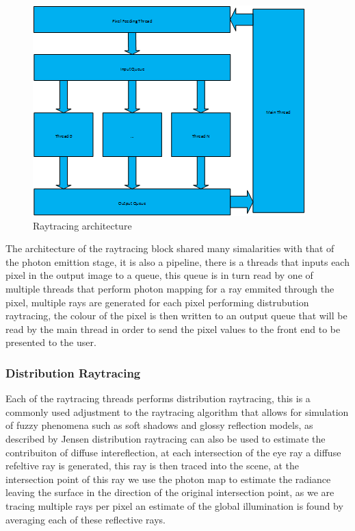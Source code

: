 \begin{figure}
\centering
\includegraphics{./images/pixel_threading.png}
\caption{Raytracing architecture}
\label{fig:pixel_generation}
\end{figure}

The architecture of the raytracing block shared many simalarities with that of the photon emittion stage,
it is also a pipeline, there is a threads that inputs each pixel in the output image to a queue, this queue
is in turn read by one of multiple threads that perform photon mapping for a ray emmited through the pixel,
multiple rays are generated for each pixel performing distrubution raytracing, the colour of the pixel is
then written to an output queue that will be read by the main thread in order to send the pixel values to
the front end to be presented to the user.

\subsubsection{Distribution Raytracing}
Each of the raytracing threads performs distribution raytracing, this is a commonly used adjustment to the 
raytracing algorithm that allows for simulation of fuzzy phenomena such as soft shadows and glossy reflection
models, as described by Jensen \cite{JensenBook} distribution raytracing can also be used to estimate the contribuiton
of diffuse intereflection, at each intersection of the eye ray a diffuse refeltive 
 ray is generated, this ray is then traced into the scene, at the intersection point of this ray
we use the photon map to estimate the radiance leaving the surface in the direction of the original intersection
point, as we are tracing multiple rays per pixel an estimate of the global illumination is found by averaging each
of these reflective rays.

